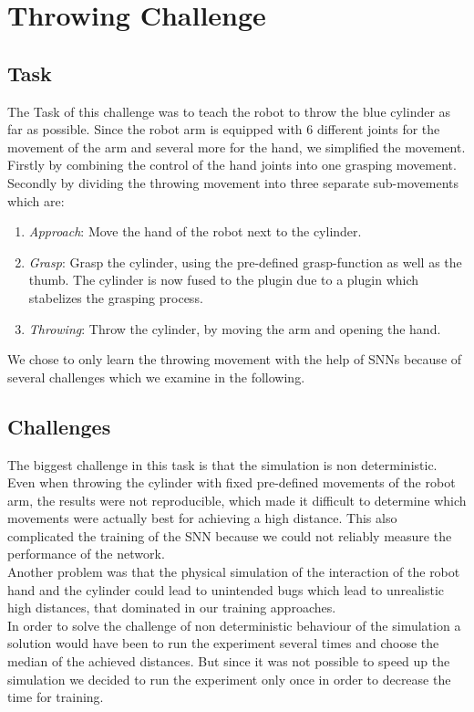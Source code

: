 \section{Throwing Challenge}
\subsection{Task}
The Task of this challenge was to teach the robot to throw the blue cylinder as far as possible. Since the robot arm is equipped with 6 different joints for the movement of the arm and several more for the hand, we simplified the movement. Firstly by combining the control of the hand joints into one grasping movement. Secondly by dividing the throwing movement into three separate sub-movements which are:
 \begin{enumerate}
\item \textit{Approach}: Move the hand of the robot next to the cylinder.
\item \textit{Grasp}: Grasp the cylinder, using the pre-defined grasp-function as well as the thumb. The cylinder is now fused to the plugin due to a plugin which stabelizes the grasping process.
\item \textit{Throwing}: Throw the cylinder, by moving the arm and opening the hand. 
\end{enumerate}
We chose to only learn the throwing movement with the help of SNNs because of several challenges which we examine in the following.

\subsection{Challenges}
\label{sec:challenges}
The biggest challenge in this task is that the simulation is non deterministic. Even when throwing the cylinder with fixed pre-defined movements of the robot arm, the results were not reproducible, which made it difficult to determine which movements were actually best for achieving a high distance. This also complicated the training of the SNN because we could not reliably measure the performance of the network.\\
Another problem was that the physical simulation of the interaction of the robot hand and the cylinder could lead to unintended bugs which lead to unrealistic high distances, that dominated in our training approaches.\\
In order to solve the challenge of non deterministic behaviour of the simulation a solution would have been to run the experiment several times and choose the median of the achieved distances. But since it was not possible to speed up the simulation we decided to run the experiment only once in order to decrease the time for training.\\




